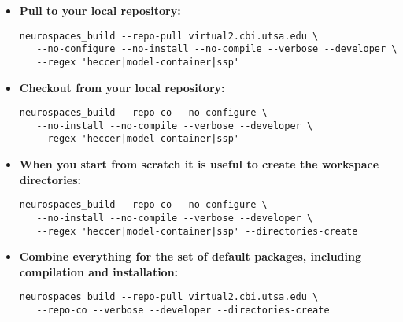 \documentclass[12pt]{article}
\begin{document}
\begin{itemize}
\item {\bf Pull to your local repository:}
\begin{verbatim}
neurospaces_build --repo-pull virtual2.cbi.utsa.edu \
   --no-configure --no-install --no-compile --verbose --developer \
   --regex 'heccer|model-container|ssp'
\end{verbatim}

\item {\bf Checkout from your local repository:}
\begin{verbatim}
neurospaces_build --repo-co --no-configure \
   --no-install --no-compile --verbose --developer \
   --regex 'heccer|model-container|ssp'
\end{verbatim}

\item {\bf When you start from scratch it is useful to create the workspace directories:}
\begin{verbatim}
neurospaces_build --repo-co --no-configure \
   --no-install --no-compile --verbose --developer \
   --regex 'heccer|model-container|ssp' --directories-create
\end{verbatim}

\item {\bf Combine everything for the set of default packages, including compilation and installation:}
\begin{verbatim}
neurospaces_build --repo-pull virtual2.cbi.utsa.edu \
   --repo-co --verbose --developer --directories-create
\end{verbatim}

\end{itemize}
\end{document}
